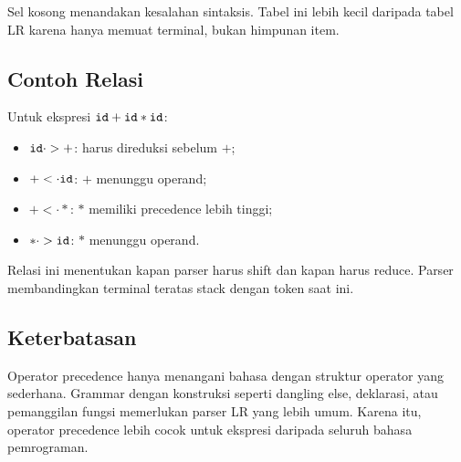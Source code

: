 Sel kosong menandakan kesalahan sintaksis. Tabel ini lebih kecil
daripada tabel LR karena hanya memuat terminal, bukan himpunan item.

\subsection{Contoh Relasi}

Untuk ekspresi \(\texttt{id} + \texttt{id} * \texttt{id}\):
\begin{itemize}[leftmargin=*]
  \item \(\texttt{id} \cdot> +\):  harus direduksi sebelum
        \(+\);
  \item \(+ <\cdot \texttt{id}\): \(+\) menunggu operand;
  \item \(+ <\cdot *\): \(*\) memiliki precedence lebih tinggi;
  \item \(* \cdot> \texttt{id}\): \(*\) menunggu operand.
\end{itemize}

Relasi ini menentukan kapan parser harus shift dan kapan harus
reduce. Parser membandingkan terminal teratas stack dengan token
saat ini.

\subsection{Keterbatasan}

Operator precedence hanya menangani bahasa dengan struktur operator
yang sederhana. Grammar dengan konstruksi seperti dangling else,
deklarasi, atau pemanggilan fungsi memerlukan parser LR yang lebih
umum. Karena itu, operator precedence lebih cocok untuk ekspresi
daripada seluruh bahasa pemrograman.
